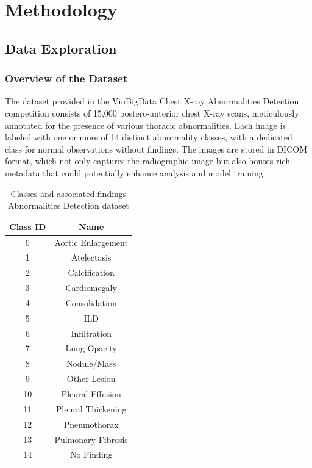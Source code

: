 \documentclass[12pt,oneside]{book} %
\begin{document}
\chapter{Methodology}

\section{Data Exploration}

\subsection{Overview of the Dataset}

The dataset provided in the VinBigData Chest X-ray Abnormalities Detection
competition consists of 15,000 postero-anterior chest X-ray scans, meticulously
annotated for the presence of various thoracic abnormalities. Each image is
labeled with one or more of 14 distinct abnormality classes, with a dedicated
class for normal observations without findings. The images are stored in DICOM
format, which not only captures the radiographic image but also houses rich
metadata that could potentially enhance analysis and model training.

\begin{table}[H]
    \centering
    \begin{tabular}{|c|c|}
        \hline
        \textbf{Class ID} & \textbf{Name}      \\
        \hline
        0                 & Aortic Enlargement \\
        1                 & Atelectasis        \\
        2                 & Calcification      \\
        3                 & Cardiomegaly       \\
        4                 & Consolidation      \\
        5                 & ILD                \\
        6                 & Infiltration       \\
        7                 & Lung Opacity       \\
        8                 & Nodule/Mass        \\
        9                 & Other Lesion       \\
        10                & Pleural Effusion   \\
        11                & Pleural Thickening \\
        12                & Pneumothorax       \\
        13                & Pulmonary Fibrosis \\
        14                & No Finding         \\
        \hline
    \end{tabular}
    \caption{Classes and associated findings Abnormalities Detection dataset}
    \label{tab:classes}
\end{table}
\end{document}
